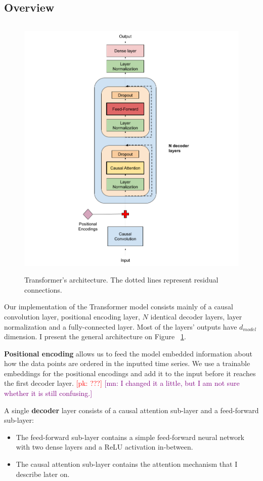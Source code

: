\documentclass[en]{pracamgr}
\newcommand{\pk}[1]{\textcolor{red}{\small [pk: #1]}}
\newcommand{\mn}[1]{\textcolor{purple}{\small [mn: #1]}}
\begin{document}
\subsection{Overview}

\begin{figure}[ht!]
	\centering
	\includegraphics[height=130mm]{decoder3.png}
	\caption{Transformer's architecture. The dotted lines represent residual connections. \label{our-decoder}}
\end{figure}



Our implementation of the Transformer model consists mainly of a causal convolution layer, positional encoding layer, $N$ identical decoder layers, layer normalization and a fully-connected layer. 
Most of the layers' outputs have $d_{model}$ dimension.
I present the general architecture on Figure ~\ref{our-decoder}.

\textbf{Positional encoding} allows us to feed the model embedded information about how the data points are ordered in the inputted time series.
We use a trainable embeddings for the positional encodings and add it to the input before it reaches the first decoder layer. \pk{???} \mn{I changed it a little, but I am not sure whether it is still confusing.}

A single \textbf{decoder} layer consists of a causal attention sub-layer and a feed-forward sub-layer:
\begin{itemize}
	\item The feed-forward sub-layer contains a simple feed-forward neural network with two dense layers and a ReLU activation in-between.
	\item The causal attention sub-layer contains the attention mechanism that I describe later on.
\end{itemize}
\end{document}
